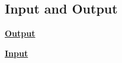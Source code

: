 \subsection{Input and Output}
    {\centering\underline{\textbf{Output}} \par}
    
    {\centering\underline{\textbf{Input}} \par}
    